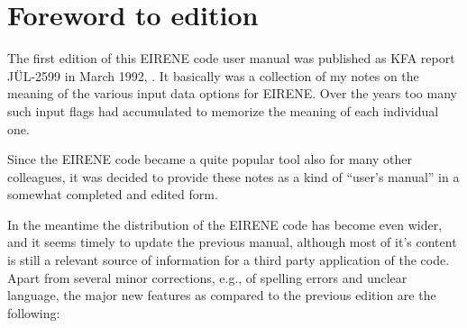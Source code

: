 
\section*{Foreword to  edition}
\label{forew2}
\bigskip

The first edition of this EIRENE code user manual was published as KFA report
J\"UL-2599 in March 1992, \cite{kn:Reiter92a}.
It basically was a collection of my notes on the meaning of the various input
data options for EIRENE.
Over the years too many such input flags had accumulated to memorize the
meaning of each individual one.

Since the EIRENE code became a quite popular tool also for many other
colleagues, it was decided to provide these notes as a kind of ``user's
manual'' in a somewhat completed and edited form.

In the meantime the distribution of the EIRENE code has become even wider, and
it seems timely to update the previous manual, although most of it's content is
still a relevant source of information for a third party application of the
code.
Apart from several minor corrections, e.g., of spelling errors and unclear
language, the major new features as compared to the previous edition are the
following:


